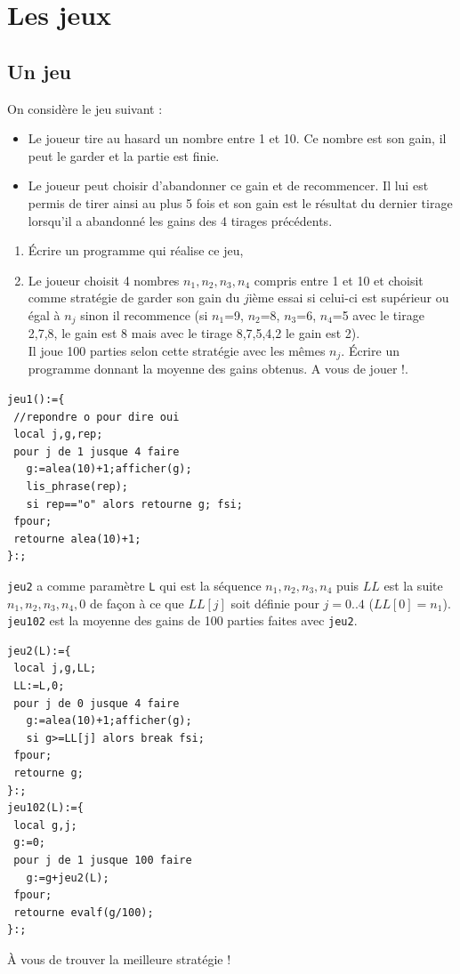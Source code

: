 \documentclass[a4paper,11pt]{book}
\begin{document}
\chapter{Les jeux}
\section{Un jeu}
On consid\`ere le jeu suivant :
\begin{itemize}
\item Le joueur tire au hasard un nombre entre 1 et 10. Ce nombre est son gain,
il peut le garder et la partie est finie.
\item Le joueur peut choisir d'abandonner ce gain et de recommencer. Il lui est
permis de tirer ainsi au plus 5 fois et son gain est le r\'esultat du dernier 
tirage lorsqu'il a abandonn\'e les gains des 4 tirages pr\'ec\'edents.
\end{itemize}
\begin{enumerate}
\item \'Ecrire un programme qui r\'ealise ce jeu, 
\item Le joueur choisit 4 nombres $n_1,n_2,n_3,n_4$ compris entre 1 et 10 et  
choisit comme strat\'egie de garder son gain du $j$i\`eme essai si celui-ci est
sup\'erieur ou \'egal \`a $n_j$ sinon il recommence (si $n_1$=9, $n_2$=8, $n_3$=6, $n_4$=5 avec le tirage 2,7,8, le gain est 8 mais avec le tirage 8,7,5,4,2 le gain est 2).\\
Il joue 100 parties selon cette strat\'egie avec les m\^emes $n_j$.
\'Ecrire un programme donnant la moyenne des gains obtenus. A vous de jouer !.
\end{enumerate}
\begin{verbatim}
jeu1():={
 //repondre o pour dire oui
 local j,g,rep;
 pour j de 1 jusque 4 faire
   g:=alea(10)+1;afficher(g);
   lis_phrase(rep);
   si rep=="o" alors retourne g; fsi;
 fpour;
 retourne alea(10)+1;
}:;
\end{verbatim}
{\tt jeu2} a comme param\`etre  {\tt L} qui est la s\'equence $n_1,n_2,n_3,n_4$
puis $LL$ est la suite $n_1,n_2,n_3,n_4,0$ de fa\c{c}on \`a ce que $LL[j]$ 
soit d\'efinie pour $j=0..4$ ($LL[0]=n_1$).\\
{\tt jeu102} est la moyenne des gains de 100 parties faites avec {\tt jeu2}.
\begin{verbatim}
jeu2(L):={
 local j,g,LL;
 LL:=L,0;
 pour j de 0 jusque 4 faire
   g:=alea(10)+1;afficher(g);
   si g>=LL[j] alors break fsi;
 fpour;
 retourne g;
}:;
jeu102(L):={
 local g,j;
 g:=0;
 pour j de 1 jusque 100 faire
   g:=g+jeu2(L);
 fpour;
 retourne evalf(g/100);
}:;
\end{verbatim}
\`A vous de trouver la meilleure strat\'egie !
\end{document}
